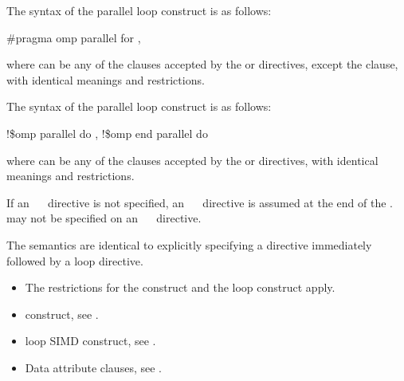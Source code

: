 {{{{\syntax
\ccppspecificstart
The syntax of the parallel loop construct is as follows:

\begin{boxedcode}
\#pragma omp parallel for \plc{[clause[ [},\plc{] clause] ... ] new-line}
\end{boxedcode}

where  can be any of the clauses accepted by the  or  directives, 
except the  clause, with identical meanings and restrictions.
\ccppspecificend

\fortranspecificstart
The syntax of the parallel loop construct is as follows:

\begin{boxedcode}
!\$omp parallel do \plc{[clause[ [},\plc{] clause] ... ]}
\plc{[}!\$omp end parallel do\plc{]} 
\end{boxedcode}

where  can be any of the clauses accepted by the  or  directives, 
with identical meanings and restrictions. 

If an ~~ directive is not specified, an ~~ directive is 
assumed at the end of the .  may not be specified on an 
~~ directive.
\fortranspecificend

\descr
The semantics are identical to explicitly specifying a  directive immediately 
followed by a loop directive.

\restrictions
\begin{itemize}
\item The restrictions for the  construct and the loop construct apply.
\end{itemize}

\crossreferences
\begin{itemize}
\item {} construct, see 
.

\item loop SIMD construct, see 
.

\item Data attribute clauses, see 
.
\end{itemize}







}}}}
